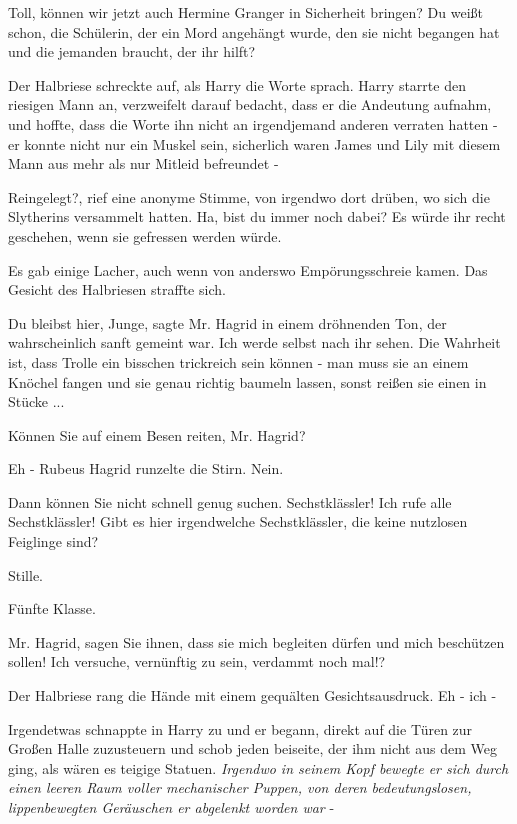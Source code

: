 \glqq{}Toll, können wir jetzt auch Hermine Granger in Sicherheit bringen? Du
weißt schon, die Schülerin, der ein Mord angehängt wurde, den sie nicht begangen
hat und die jemanden braucht, der ihr hilft?\grqq{}

Der Halbriese schreckte auf, als Harry die Worte sprach. Harry starrte den
riesigen Mann an, verzweifelt darauf bedacht, dass er die Andeutung aufnahm, und
hoffte, dass die Worte ihn nicht an irgendjemand anderen verraten hatten - er
konnte nicht nur ein Muskel sein, sicherlich waren James und Lily mit diesem
Mann aus mehr als nur Mitleid befreundet -

\glqq{}Reingelegt?\grqq{}, rief eine anonyme Stimme, von irgendwo dort drüben, wo
sich die Slytherins versammelt hatten. \glqq{}Ha, bist du immer noch dabei? Es
würde ihr recht geschehen, wenn sie gefressen werden würde.\grqq{}

Es gab einige Lacher, auch wenn von anderswo Empörungsschreie kamen. Das Gesicht
des Halbriesen straffte sich.

\glqq{}Du bleibst hier, Junge\grqq{}, sagte Mr. Hagrid in einem dröhnenden Ton,
der wahrscheinlich sanft gemeint war. \glqq{}Ich werde selbst nach ihr sehen. Die
Wahrheit ist, dass Trolle ein bisschen trickreich sein können - man muss sie an
einem Knöchel fangen und sie genau richtig baumeln lassen, sonst reißen sie
einen in Stücke ...\grqq{}

\glqq{}Können Sie auf einem Besen reiten, Mr. Hagrid?\grqq{}

\glqq{}Eh -\grqq{} Rubeus Hagrid runzelte die Stirn. \glqq{}Nein.\grqq{}

\glqq{}Dann können Sie nicht schnell genug suchen. Sechstklässler! Ich rufe alle
Sechstklässler! Gibt es hier irgendwelche Sechstklässler, die keine nutzlosen
Feiglinge sind?\grqq{}

Stille.

\glqq{}Fünfte Klasse\grqq{}.

Mr. Hagrid, sagen Sie ihnen, dass sie mich begleiten dürfen und mich beschützen
sollen! Ich versuche, vernünftig zu sein, verdammt noch mal!?\grqq{}

Der Halbriese rang die Hände mit einem gequälten Gesichtsausdruck. \glqq{}Eh -
ich -\grqq{}

Irgendetwas schnappte in Harry zu und er begann, direkt auf die Türen zur Großen
Halle zuzusteuern und schob jeden beiseite, der ihm nicht aus dem Weg ging, als
wären es teigige Statuen. \emph{Irgendwo in seinem Kopf bewegte er sich durch
einen leeren Raum voller mechanischer Puppen, von deren bedeutungslosen,
lippenbewegten Geräuschen er abgelenkt worden war} -

